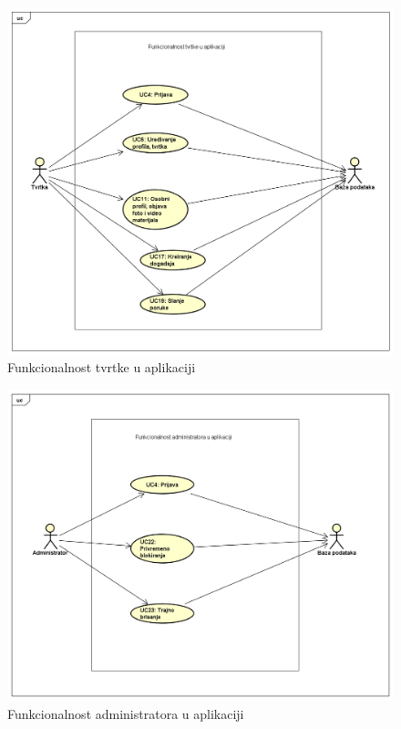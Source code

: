 					\begin{figure} 
						\includegraphics[width=\textwidth]{slike/funkcionalnost_tvrtke.png}
						\caption{Funkcionalnost tvrtke u aplikaciji}
					\end{figure}
					\begin{figure} 
						\includegraphics[width=\textwidth]{slike/funkcionalnost_administratora.png}
						\caption{Funkcionalnost administratora u aplikaciji}
					\end{figure}
				\eject		
				
